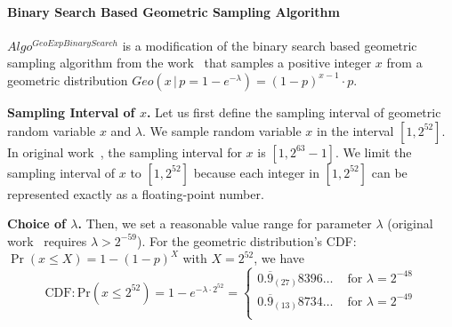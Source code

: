 \paragraph{Binary Search Based Geometric Sampling Algorithm}
\label{para:BinarySearchBasedGeometricSamplingAlgorithm}

$Algo^{GeoExpBinarySearch}$ is a modification of the binary search based geometric sampling algorithm from the work~\cite{googleDP2019GitHub} that samples a positive integer $x$ from a geometric distribution $Geo\left(x\,|\,p=1-e^{-\lambda}\right)=\left(1-p\right)^{x-1}\cdot p $.

\textbf{Sampling Interval of $x$.}
Let us first define the sampling interval of geometric random variable $x$ and $\lambda$.
We sample random variable $x $ in the interval $ \left[1, 2^{52}\right] $.
In original work~\cite{googleDP2019GitHub}, the sampling interval for $x$ is $ \left[1, 2^{63}-1\right]$. We limit the sampling interval of $x$ to $\left[1, 2^{52}\right]$ because each integer in  $\left[1, 2^{52}\right]$ can be represented exactly as a floating-point number.





\textbf{Choice of $\lambda$. }
Then, we set a reasonable value range for parameter $\lambda$ (original work~\cite{googleDP2019} requires $\lambda > 2^{-59}$).
For the geometric distribution's CDF: $\Pr\left(x\leq X \right) =1-\left(1-p\right)^X $ with $X=2^{52}$, we have
\begin{equation}
    \text{CDF}: \text{Pr}\left(x \leq 2^{52}\right)=
    1-e^{-\lambda\cdot 2^{52} }=
    \begin{cases}
        0.\overline{9}_{\left(27\right) }8396\ldots & \text{ for }\lambda=2^{-48} \\
        0.\overline{9}_{\left(13\right) }8734\ldots & \text{ for }\lambda=2^{-49} \\
    \end{cases}
\end{equation}

